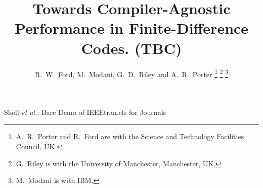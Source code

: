 \documentclass[journal]{IEEEtran}
\begin{document}
%
\title{Towards Compiler-Agnostic Performance in Finite-Difference Codes. (TBC)}
%
%

\author{R.~W.~Ford, M.~Modani, G.~D.~Riley and A.~R.~Porter%
\thanks{A.~R.~Porter and R.~Ford are with the Science and Technology Facilities Council, UK.}%
\thanks{G.~Riley is with the University of Manchester, Manchester, UK.}%
\thanks{M.~Modani is with IBM.}
}

% 
%


%
{Shell \MakeLowercase{\textit{et al.}}: Bare Demo of IEEEtran.cls for Journals}
% 




\end{document}
